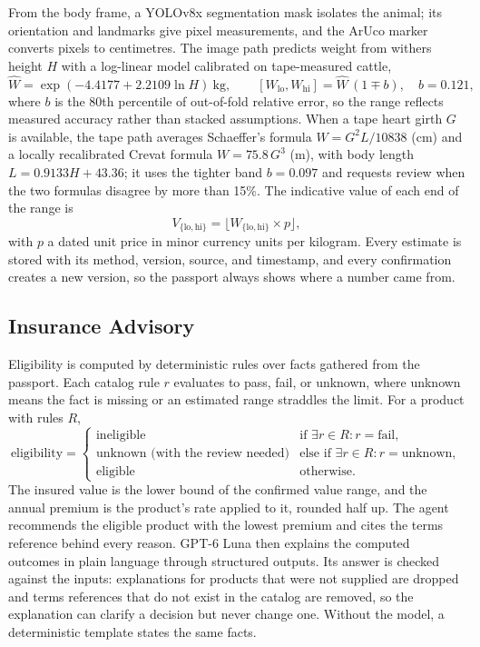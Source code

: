 \documentclass[11pt,letterpaper]{article}
\begin{document}
From the body frame, a YOLOv8x segmentation mask isolates the animal; its orientation and landmarks give pixel measurements, and the ArUco marker converts pixels to centimetres. The image path predicts weight from withers height $H$ with a log-linear model calibrated on tape-measured cattle,
\begin{equation}
\hat{W} = \exp(-4.4177 + 2.2109 \ln H) \ \text{kg}, \qquad [W_{\text{lo}}, W_{\text{hi}}] = \hat{W}\,(1 \mp b), \quad b = 0.121,
\end{equation}
where $b$ is the 80th percentile of out-of-fold relative error, so the range reflects measured accuracy rather than stacked assumptions. When a tape heart girth $G$ is available, the tape path averages Schaeffer's formula $W = G^{2} L / 10838$ (cm) and a locally recalibrated Crevat formula $W = 75.8\,G^{3}$ (m), with body length $L = 0.9133H + 43.36$; it uses the tighter band $b = 0.097$ and requests review when the two formulas disagree by more than 15\%. The indicative value of each end of the range is
\begin{equation}
V_{\{\text{lo},\text{hi}\}} = \big\lfloor W_{\{\text{lo},\text{hi}\}} \times p \big\rfloor,
\end{equation}
with $p$ a dated unit price in minor currency units per kilogram. Every estimate is stored with its method, version, source, and timestamp, and every confirmation creates a new version, so the passport always shows where a number came from.

\subsection{Insurance Advisory}

Eligibility is computed by deterministic rules over facts gathered from the passport. Each catalog rule $r$ evaluates to pass, fail, or unknown, where unknown means the fact is missing or an estimated range straddles the limit. For a product with rules $R$,
\begin{equation}
\text{eligibility} =
\begin{cases}
\text{ineligible} & \text{if } \exists r \in R: r = \text{fail},\\
\text{unknown (with the review needed)} & \text{else if } \exists r \in R: r = \text{unknown},\\
\text{eligible} & \text{otherwise.}
\end{cases}
\end{equation}
The insured value is the lower bound of the confirmed value range, and the annual premium is the product's rate applied to it, rounded half up. The agent recommends the eligible product with the lowest premium and cites the terms reference behind every reason. GPT-6 Luna then explains the computed outcomes in plain language through structured outputs. Its answer is checked against the inputs: explanations for products that were not supplied are dropped and terms references that do not exist in the catalog are removed, so the explanation can clarify a decision but never change one. Without the model, a deterministic template states the same facts.
\end{document}
